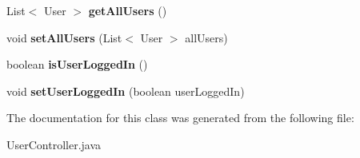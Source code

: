 \begin{DoxyCompactItemize}
List$<$ User $>$ {\bfseries get\+All\+Users} ()
\item 
\hypertarget{classch_1_1bbc_1_1partyplanner_1_1controller_1_1_user_controller_a04bdaad25a2aca511a4837ddc8d43e28}{}\label{classch_1_1bbc_1_1partyplanner_1_1controller_1_1_user_controller_a04bdaad25a2aca511a4837ddc8d43e28} 
void {\bfseries set\+All\+Users} (List$<$ User $>$ all\+Users)
\item 
\hypertarget{classch_1_1bbc_1_1partyplanner_1_1controller_1_1_user_controller_ada4a5cc6843705315fb5d38986e42568}{}\label{classch_1_1bbc_1_1partyplanner_1_1controller_1_1_user_controller_ada4a5cc6843705315fb5d38986e42568} 
boolean {\bfseries is\+User\+Logged\+In} ()
\item 
\hypertarget{classch_1_1bbc_1_1partyplanner_1_1controller_1_1_user_controller_a60f8affd66b54941ca7cd2de282c4c03}{}\label{classch_1_1bbc_1_1partyplanner_1_1controller_1_1_user_controller_a60f8affd66b54941ca7cd2de282c4c03} 
void {\bfseries set\+User\+Logged\+In} (boolean user\+Logged\+In)
\end{DoxyCompactItemize}


The documentation for this class was generated from the following file\+:\begin{DoxyCompactItemize}
\item 
User\+Controller.\+java\end{DoxyCompactItemize}

